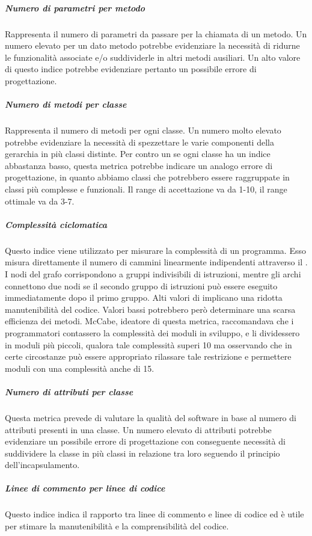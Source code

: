 \subparagraph{Numero di parametri per metodo}
Rappresenta il numero di parametri da passare per la chiamata di un metodo.
Un numero elevato per un dato metodo potrebbe evidenziare la necessità di ridurne le funzionalità associate e/o suddividerle in altri metodi ausiliari.
Un alto valore di questo indice potrebbe evidenziare pertanto un possibile errore di progettazione.

\subparagraph{Numero di metodi per classe}
Rappresenta il numero di metodi per ogni classe.
Un numero molto elevato potrebbe evidenziare la necessità di spezzettare le varie componenti della gerarchia in più classi distinte.
Per contro un se ogni classe ha un indice abbastanza basso, questa metrica potrebbe indicare un analogo errore di progettazione, in quanto abbiamo classi che potrebbero essere raggruppate in classi più complesse e funzionali.
Il range di accettazione va da 1-10, il range ottimale va da 3-7.



\subparagraph{Complessità ciclomatica}
Questo indice viene utilizzato per misurare la complessità di un programma. Esso misura direttamente il numero di cammini linearmente indipendenti attraverso il . I nodi del grafo corrispondono a gruppi indivisibili di istruzioni, mentre gli archi connettono due nodi se il secondo gruppo di istruzioni può essere eseguito immediatamente dopo il primo gruppo.
Alti valori di  implicano una ridotta manutenibilità del codice. Valori bassi potrebbero però determinare  una scarsa efficienza dei metodi. McCabe, ideatore di questa metrica, raccomandava che i programmatori contassero la complessità dei moduli in sviluppo, e li dividessero in moduli più piccoli, qualora tale complessità superi 10 ma osservando che in certe circostanze può essere appropriato rilassare tale restrizione e permettere moduli con una complessità anche di 15.

\subparagraph{Numero di attributi per classe}
Questa metrica prevede di valutare la qualità del software in base al numero di attributi presenti in una classe.
Un numero elevato di attributi potrebbe evidenziare un possibile errore di progettazione con conseguente necessità di suddividere la classe in più classi in relazione tra loro seguendo il principio dell'incapsulamento.



\subparagraph{Linee di commento per linee di codice}
Questo indice indica il rapporto tra linee di commento e linee di codice ed è utile per stimare la manutenibilità e la comprensibilità del codice. 

